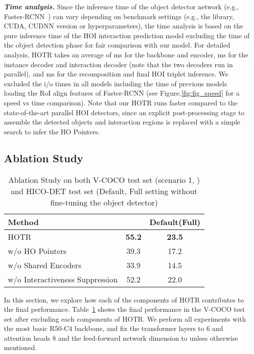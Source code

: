 \documentclass[final]{cvpr}
\begin{document}
\noindent\textit{\textbf{Time analysis.}}
Since the inference time of the object detector network (e.g., Faster-RCNN~\cite{ren2015faster}) can vary  depending on benchmark settings (e.g., the library, CUDA, CUDNN version or hyperparameters), the time analysis is based on the pure inference time of the HOI interaction prediction model excluding the time of the object detection phase for fair comparison with our model.
For detailed analysis, HOTR takes an average of ms for the backbone and encoder, ms for the instance decoder and interaction decoder (note that the two decoders run in parallel), and ms for the recomposition and final HOI triplet inference.
We excluded the i/o times in all models including the time of previous models loading the RoI align features of Faster-RCNN (see Figure.\ref{fig:fig_speed} for a speed vs time comparison).
Note that our HOTR runs  faster compared to the state-of-the-art parallel HOI detectors, since an explicit post-processing stage to assemble the detected objects and interaction regions is replaced with a simple  search to infer the HO Pointers.
\newline \subsection{Ablation Study}
\begin{table}[h!]
  \centering
  \begin{tabular}{l c c}
    \toprule
Method &  & Default(Full) \\ \midrule
    HOTR & \textbf{55.2} & \textbf{23.5} \\
    w/o HO Pointers & 39.3 & 17.2 \\
    w/o Shared Encoders & 33.9 & 14.5 \\
    w/o Interactiveness Suppression & 52.2 & 22.0 \\
\bottomrule
\end{tabular}
\vspace{3pt}
\caption{Ablation Study on both V-COCO test set (scenario 1, ) and HICO-DET test set (Default, Full setting without fine-tuning the object detector)}
\label{tab:Ablation}
\end{table} In this section, we explore how each of the components of HOTR contributes to the final performance.
Table~\ref{tab:Ablation} shows the final performance in the V-COCO test set after excluding each components of HOTR.
We perform all experiments with the most basic R50-C4 backbone, and fix the transformer layers to 6 and attention heads 8 and the feed-forward network dimension to  unless otherwise mentioned.
\newline
\end{document}
